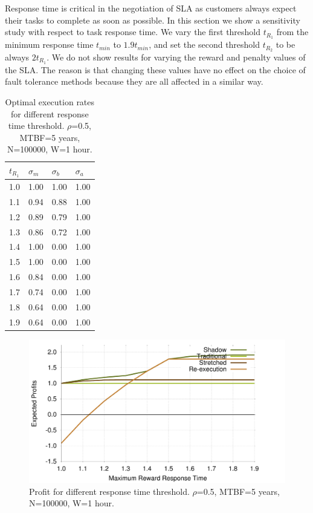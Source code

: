 Response time is critical in the negotiation of SLA as customers
always expect their tasks to complete as soon as possible. In this
section we show a sensitivity study with respect to task response
time. We vary the first threshold $t_{R_1}$ from the minimum response
time $t_{min}$ to $1.9t_{min}$, and set the second threshold $t_{R_2}$
to be always $2t_{R_1}$. We do not show results for varying the reward
and penalty values of the SLA. The reason is that changing these
values have no effect on the choice of fault tolerance methods because
they are all affected in a similar way.

\begin{table}[!h]\small
	\caption{Optimal execution rates for different response time threshold. $\rho$=0.5, MTBF=5 years, N=100000, W=1 hour.}
	\centering
		\begin{tabular}{|p{1cm}|  p{1cm}|p{1cm}|p{1cm}|}
		\hline
		$t_{R_1}$ & $\sigma_m$ & $\sigma_b$ & $\sigma_a$ \\
		\hline
		1.0	&	1.00 & 	1.00 &	1.00 \\
		\hline
		1.1	&	0.94 &	0.88 &	1.00 \\
		\hline
		1.2	&	0.89 &	0.79 &	1.00 \\
		\hline
		1.3	&	0.86 &	0.72 &	1.00 \\
		\hline
		1.4	&	1.00 &	0.00 &	1.00 \\
		\hline
		1.5	&	1.00 &	0.00 &	1.00 \\
		\hline
		1.6	&	0.84 &	0.00 &	1.00 \\
		\hline
		1.7	&	0.74 &	0.00 &	1.00 \\
		\hline
		1.8	&	0.64 &	0.00 &	1.00 \\
		\hline
		1.9	&	0.64 &	0.00 &	1.00 \\
		\hline
		\end{tabular}
	\label{tbl:t}
\end{table}

\begin{figure}[!h]	
	\begin{center}
		\includegraphics[width=\columnwidth]{Figures/t_profit}
	\end{center}
	\caption{Profit for different response time threshold. $\rho$=0.5, MTBF=5 years, N=100000, W=1 hour.}
	\label{fig:t}
\end{figure}

